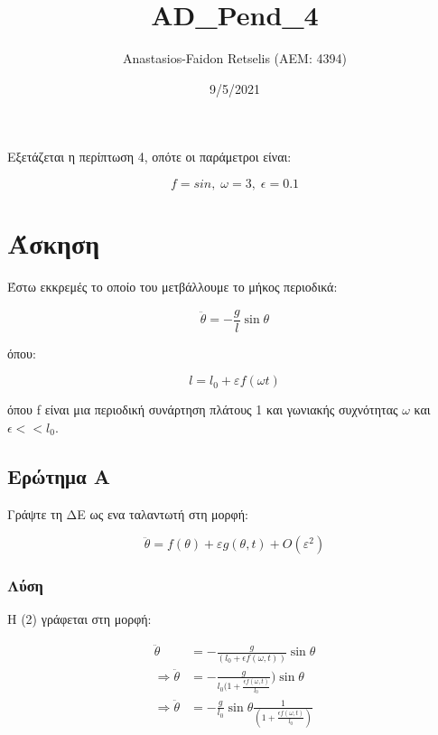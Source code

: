 \documentclass{article}
\title{\textlatin{AD\_Pend\_4}}
\author{\textlatin{Anastasios-Faidon Retselis (AEM: 4394)}}
\date{9/5/2021}
\begin{document}
\maketitle

Εξετάζεται η περίπτωση 4, οπότε οι παράμετροι είναι: 

\begin{equation}
    f=sin,\; \omega=3,\; \epsilon=0.1 
\end{equation}

\section{Άσκηση}

\indent Έστω εκκρεμές το οποίο του μετβάλλουμε το μήκος περιοδικά:

\begin{equation}
\ddot{\theta}=-\frac{g}{l} \sin \theta
\end{equation}

όπου:

\begin{equation}
l=l_{0}+\varepsilon f(\omega t)
\end{equation}

όπου \textlatin{f} είναι μια περιοδική συνάρτηση πλάτους 1 και γωνιακής συχνότητας \(\omega\) και \(\epsilon << l_{0}\).


\subsection{Ερώτημα Α}

\indent Γράψτε τη ΔΕ ως ενα ταλαντωτή στη μορφή:

\begin{equation}
\ddot{\theta}=f(\theta)+\varepsilon g(\theta, t)+O\left(\varepsilon^{2}\right)
\end{equation}

\subsubsection{Λύση}

\indent H (2) γράφεται στη μορφή:

\begin{align}
    \ddot{\theta} &=-\frac{g}{(l_{0}+\epsilon f(\omega, t))} \sin \theta \\
    \Rightarrow \ddot{\theta} &=-\frac{g}{l_{0}(1+\frac{\epsilon f(\omega, t)}{l_{0}}}) \sin \theta \\
    \Rightarrow \ddot{\theta} &=-\frac{g}{l_{0}} \sin \theta \frac{1}{(1+\frac{\epsilon f(\omega, t)}{l_{0}})}
\end{align}
\end{document}
